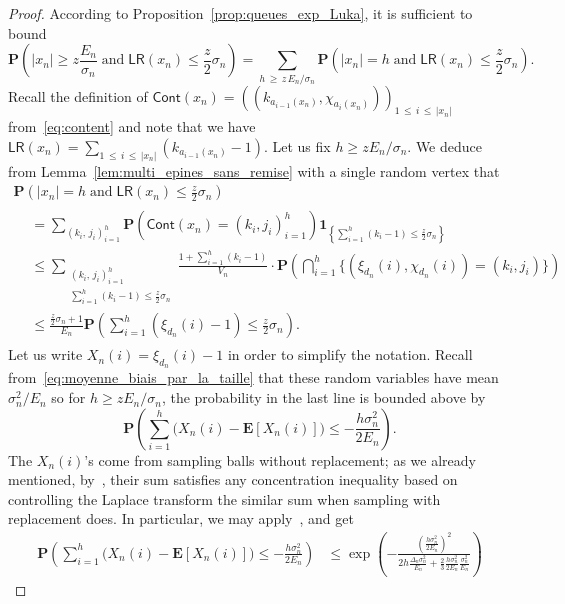 \documentclass[AHL,Unicode,longabstracts,published]{cedram}
\newcommand{\ensembles}[1]{\mathbf{#1}}
\renewcommand{\P}{\ensembles{P}}
\newcommand{\E}{\ensembles{E}}
\renewcommand{\Pr}[1]{\P\left(#1\right)}
\newcommand{\1}{\ensembles{1}}
\renewcommand{\le}{\leqslant}
\renewcommand{\ge}{\geqslant}
\newcommand{\LR}{\mathsf{LR}}
\newcommand{\Cont}{\mathsf{Cont}}
\newcommand{\edges}{E}
\newcommand{\vertices}{V}
\begin{document}
\begin{proof}
According to Proposition~\ref{prop:queues_exp_Luka}, it is sufficient to bound
\[
\Pr{|x_n| \ge z \frac{\edges_n}{\sigma_n}\;\text{and} \;\LR\left(x_n\right) \le \frac{z}{2} \sigma_n} = \sum_{h\, \ge\,z\,\edges_n / \sigma_n} \Pr{|x_n| = h\; \text{and}\; \LR(x_n) \le \frac{z}{2} \sigma_n}.
\]
Recall the definition of $\Cont(x_n) = ((k_{a_{i-1}(x_n)}, \chi_{a_i(x_n)}))_{1\,\le\,i\,\le\,|x_n|}$ from~\eqref{eq:content} and note that we have $\LR(x_n) = \sum_{1\,\le\,i\,\le\,|x_n|} (k_{a_{i-1}(x_n)} - 1)$. Let us fix $h \ge z \edges_n / \sigma_n$. We deduce from Lemma~\ref{lem:multi_epines_sans_remise} with a single random vertex that
\begin{multline*}
\Pr{|x_n| = h\;\text{and}\; \LR(x_n) \le \frac{z}{2} \sigma_n}
\\
\begin{aligned}
&= \sum_{\left(k_i,\,j_i\right)_{i=1}^h} \Pr{\Cont\left(x_n\right) = \left(k_i, j_i\right)_{i=1}^h} \1_{\left\{\sum\limits_{i=1}^h \left(k_i - 1\right) \le \frac{z}{2} \sigma_n\right\}}
\\
&\le \sum_{\substack{\left(k_i,\,j_i\right)_{i=1}^h \\ \sum\limits_{i=1}^h \left(k_i - 1\right) \le \frac{z}{2} \sigma_n}}
\frac{1 + \sum\limits_{i=1}^h \left(k_i - 1\right)}{\vertices_n} \cdot
\Pr{\bigcap_{i=1}^h \big\{\left(\xi_{d_n}(i), \chi_{d_n}(i)\right) = \left(k_i, j_i\right)\big\}}
\\
&\le \frac{\frac{z}{2} \sigma_n + 1}{\edges_n} \Pr{\sum_{i=1}^h \left(\xi_{d_n}(i) - 1\right) \le \frac{z}{2} \sigma_n}.
\end{aligned}
\end{multline*}
Let us write $X_n(i) = \xi_{d_n}(i) - 1$ in order to simplify the notation. Recall from~\eqref{eq:moyenne_biais_par_la_taille} that these random variables have mean $\sigma_n^2 / \edges_n$ so for $h \ge z \edges_n / \sigma_n$, the probability in the last line is bounded above by
\[
\Pr{\sum_{i=1}^h \big(X_n(i) - \E[X_n(i)]\big) \le - \frac{h \sigma_n^2}{2 \edges_n}}.
\]
The $X_n(i)$'s come from sampling balls without replacement; as we already mentioned, by~\cite[Proposition~20.6]{Ald85}, their sum satisfies any concentration inequality based on controlling the Laplace transform the similar sum when sampling with replacement does. In particular, we may apply~\cite[Theorem~2.7]{McD98}, and get
\begin{align*}
\Pr{\sum_{i=1}^h \big(X_n(i) - \E\left[X_n(i)\right]\big) \le - \frac{h \sigma_n^2}{2 \edges_n}} &\le \exp\left(- \frac{\left(\frac{h \sigma_n^2}{2 \edges_n}\right)^2}{2 h \frac{\Delta_n \sigma_n^2}{\edges_n} + \frac{2}{3} \frac{h \sigma_n^2}{2 \edges_n} \frac{\sigma_n^2}{\edges_n}}\right)

\end{align*}
\end{proof}
\end{document}
